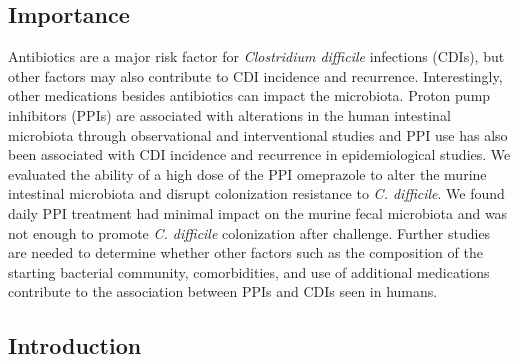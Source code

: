 \documentclass[11pt,]{article}
\begin{document}
\subsection{Importance}\label{importance}

Antibiotics are a major risk factor for \emph{Clostridium difficile}
infections (CDIs), but other factors may also contribute to CDI
incidence and recurrence. Interestingly, other medications besides
antibiotics can impact the microbiota. Proton pump inhibitors (PPIs) are
associated with alterations in the human intestinal microbiota through
observational and interventional studies and PPI use has also been
associated with CDI incidence and recurrence in epidemiological studies.
We evaluated the ability of a high dose of the PPI omeprazole to alter
the murine intestinal microbiota and disrupt colonization resistance to
\emph{C. difficile}. We found daily PPI treatment had minimal impact on
the murine fecal microbiota and was not enough to promote \emph{C.
difficile} colonization after challenge. Further studies are needed to
determine whether other factors such as the composition of the starting
bacterial community, comorbidities, and use of additional medications
contribute to the association between PPIs and CDIs seen in humans.

\newpage

\subsection{Introduction}\label{introduction}
\end{document}

